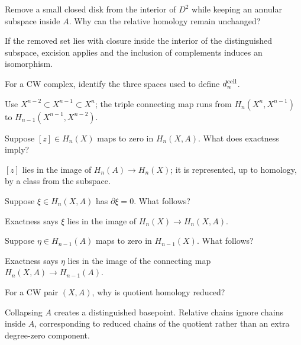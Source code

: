 \begin{problem}\label{prob:viii19-10}
Remove a small closed disk from the interior of \(D^2\) while keeping an annular subspace inside \(A\). Why can the relative homology remain unchanged?
\end{problem}
\begin{solution}
If the removed set lies with closure inside the interior of the distinguished subspace, excision applies and the inclusion of complements induces an isomorphism.
\end{solution}

\begin{problem}\label{prob:viii19-11}
For a CW complex, identify the three spaces used to define \(d_n^{\rm cell}\).
\end{problem}
\begin{solution}
Use \(X^{n-2}\subset X^{n-1}\subset X^n\); the triple connecting map runs from \(H_n(X^n,X^{n-1})\) to \(H_{n-1}(X^{n-1},X^{n-2})\).
\end{solution}

\begin{problem}\label{prob:viii19-12}
Suppose \([z]\in H_n(X)\) maps to zero in \(H_n(X,A)\). What does exactness imply?
\end{problem}
\begin{solution}
\([z]\) lies in the image of \(H_n(A)\to H_n(X)\); it is represented, up to homology, by a class from the subspace.
\end{solution}

\begin{problem}\label{prob:viii19-13}
Suppose \(\xi\in H_n(X,A)\) has \(\partial\xi=0\). What follows?
\end{problem}
\begin{solution}
Exactness says \(\xi\) lies in the image of \(H_n(X)\to H_n(X,A)\).
\end{solution}

\begin{problem}\label{prob:viii19-14}
Suppose \(\eta\in H_{n-1}(A)\) maps to zero in \(H_{n-1}(X)\). What follows?
\end{problem}
\begin{solution}
Exactness says \(\eta\) lies in the image of the connecting map \(H_n(X,A)\to H_{n-1}(A)\).
\end{solution}

\begin{problem}\label{prob:viii19-15}
For a CW pair \((X,A)\), why is quotient homology reduced?
\end{problem}
\begin{solution}
Collapsing \(A\) creates a distinguished basepoint. Relative chains ignore chains inside \(A\), corresponding to reduced chains of the quotient rather than an extra degree-zero component.
\end{solution}

